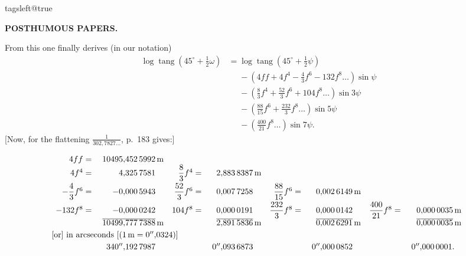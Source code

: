 \begingroup
\csname tagsleft@true\endcsname
\par\clearpage
\noindent{}\hfill{\small\textbf{POSTHUMOUS PAPERS.}}\hfill\null\par\medskip

From this one finally derives (in our notation)
\[
\begin{aligned}
\log\operatorname{tang}(45^\circ+\tfrac12\omega)&=\log\operatorname{tang}(45^\circ+\tfrac12\psi)\\
&\phantom{={}}-\left(4ff+4f^4-\frac43f^6-132f^8\ldots\right)\sin\psi\\
&\phantom{={}}-\left(\frac83f^4+\frac{52}3f^6+104f^8\ldots\right)\sin3\psi\\
&\phantom{={}}-\left(\frac{88}{15}f^6+\frac{232}3f^8\ldots\right)\sin5\psi\\
&\phantom{={}}-\left(\frac{400}{21}f^8\ldots\right)\sin7\psi.
\end{aligned}
\]
[Now, for the flattening \(\frac{1}{302{,}7827\ldots}\), p.\ 183 gives:]
{\small\setlength{\arraycolsep}{1.5pt}
\[
\begin{array}{rr@{\quad}rr@{\quad}rr@{\quad}rr}
4ff={}&10495{,}452\,5992\,\mathrm m\\
4f^4={}&4{,}325\,7581\phantom{\,\mathrm m}
 & \dfrac83 f^4={}&2{,}883\,8387\,\mathrm m\\[6pt]
-\dfrac43 f^6={}&-0{,}000\,5943\phantom{\,\mathrm m}
 & \dfrac{52}3 f^6={}&0{,}007\,7258\phantom{\,\mathrm m}
 & \dfrac{88}{15}f^6={}&0{,}002\,6149\,\mathrm m\\[6pt]
-132f^8={}&-0{,}000\,0242\phantom{\,\mathrm m}
 & 104f^8={}&0{,}000\,0191\phantom{\,\mathrm m}
 & \dfrac{232}3 f^8={}&0{,}000\,0142\phantom{\,\mathrm m}
 & \dfrac{400}{21}f^8={}&0{,}000\,0035\,\mathrm m\\
 &\overline{10499{,}777\,7388}\,\mathrm m
 & &\overline{2{,}891\,5836}\,\mathrm m
 & &\overline{0{,}002\,6291}\,\mathrm m
 & &\overline{0{,}000\,0035}\,\mathrm m\\[.6ex]
\multicolumn{8}{@{}l}{\text{[or] in arcseconds [(}1\,\mathrm m=0^{\prime\prime}{,}0324\text{)]}}\\[.6ex]
 &340^{\prime\prime}{,}192\,7987\phantom{\,\mathrm m}
 & &0^{\prime\prime}{,}093\,6873\phantom{\,\mathrm m}
 & &0^{\prime\prime}{,}000\,0852\phantom{\,\mathrm m}
 & &0^{\prime\prime}{,}000\,0001.\phantom{\mathrm m}
\end{array}
\]
\par}

